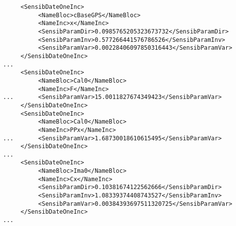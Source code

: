 \begin{verbatim}
     <SensibDateOneInc>
          <NameBloc>cBaseGPS</NameBloc>
          <NameInc>x</NameInc>
          <SensibParamDir>0.0985765205323673732</SensibParamDir>
          <SensibParamInv>0.577266441576786526</SensibParamInv>
          <SensibParamVar>0.00228406097850316443</SensibParamVar>
     </SensibDateOneInc>
...
     <SensibDateOneInc>
          <NameBloc>Cal0</NameBloc>
          <NameInc>F</NameInc>
...       <SensibParamVar>15.0011827674349423</SensibParamVar>
     </SensibDateOneInc>
     <SensibDateOneInc>
          <NameBloc>Cal0</NameBloc>
          <NameInc>PPx</NameInc>
...       <SensibParamVar>1.68730018610615495</SensibParamVar>
     </SensibDateOneInc>
...
     <SensibDateOneInc>
          <NameBloc>Ima0</NameBloc>
          <NameInc>Cx</NameInc>
          <SensibParamDir>0.10381674122562666</SensibParamDir>
          <SensibParamInv>1.08339374408743527</SensibParamInv>
          <SensibParamVar>0.00384393697511320725</SensibParamVar>
     </SensibDateOneInc>
...
\end{verbatim}





